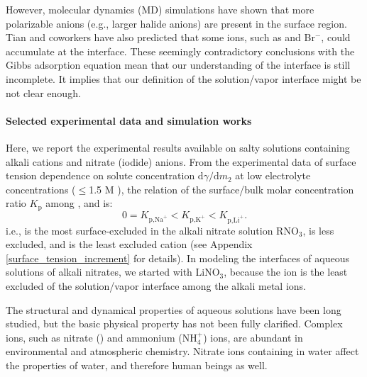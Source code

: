 %
However, molecular dynamics (MD) simulations have shown that more polarizable anions (e.g., larger halide anions) 
are present in the surface region\cite{Jungwirth2001,Jungwirth2002}. 
Tian and coworkers\cite{CST11} have also predicted that some ions, such as \I and Br$^{-}$, could accumulate at the interface.
These seemingly contradictory conclusions with the Gibbs adsorption equation mean that our understanding of the interface is still incomplete. 
It implies that our definition of the solution/vapor interface might be not clear enough. 


\paragraph{Selected experimental data and simulation works}
Here, we report the experimental results available on salty solutions containing alkali cations and nitrate (iodide) anions\cite{PS03,AJ12,HuaWei2014}. 
From the experimental data of surface tension dependence on solute concentration $\text{d}\gamma/\text{d}m_2$ 
at low electrolyte concentrations ($\leq$1.5 M )\cite{Weissenborn95,Hey81,Jarvis68,Jarvis72}, 
the relation of the surface/bulk molar concentration ratio $K_{\text{p}}$\cite{Pegram2006} among \li, \Na and \K is: 
\begin{equation}
0=K_{\text{p,Na}^+}< K_{\text{p,K}^+}< K_{\text{p,Li}^+}.
\label{eq:bscr}
\end{equation}
i.e., \Na is the most surface-excluded in the alkali nitrate solution RNO$_3$, \K is less excluded, 
and \Li is the least excluded cation (see Appendix \ref{surface_tension_increment} for details).
In modeling the interfaces of aqueous solutions of alkali nitrates, we started with LiNO$_3$, 
because the \Li ion is the least excluded of the solution/vapor interface among the alkali metal ions. 

The structural and dynamical properties of aqueous solutions have been long studied, but the basic physical
property has not been fully clarified.
Complex ions, such as nitrate (\nitrate) and ammonium (NH$_4^+$) ions,
are abundant in environmental and  atmospheric chemistry.\cite{SG05,Yadav2017} 
Nitrate ions containing in water affect the properties of water, and therefore human beings as well.\cite{Comly45,Knobeloch00} 

